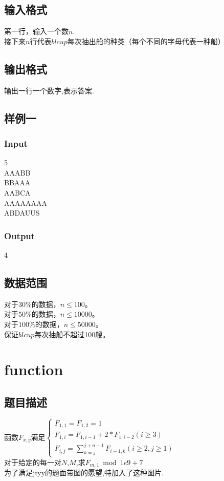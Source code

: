 \documentclass{article}
\begin{document}
\begin{spacing}{1.0}
\subsection{输入格式}
第一行，输入一个数$n$.\\
接下来$n$行代表$blcup$每次抽出船的种类（每个不同的字母代表一种船）\\
\subsection{输出格式}
输出一行一个数字,表示答案.

\subsection{样例一}
\subsubsection{Input}
5\\
AAABB\\
BBAAA\\
AABCA\\
AAAAAAAA\\
ABDAUUS\\
\subsubsection{Output}
4

\subsection{数据范围}
对于$30\%$的数据，$n\le100$。\\
对于$50\%$的数据，$n\le10000$。\\
对于$100\%$的数据，$n\le50000$。\\
保证$blcup$每次抽船不超过100艘。 \\
\newpage

\section{function}
\subsection{题目描述}
函数$F_{x,y}$满足$\begin{cases}F_{1,1}=F_{1,2}=1\\F_{1,i}=F_{1,i-1}+2*F_{1,i-2} (i\geq 3)\\F_{i,j}=\sum_{k=j}^{j+n-1}F_{i-1,k}(i\geq 2,j\geq 1)\end{cases}$\\
对于给定的每一对$N$,$M$,求$F_{m,1}\bmod 1e9+7$\\
为了满足jtyy的题面带图的愿望,特加入了这种图片.\\
\\

\end{spacing}
\end{document}
